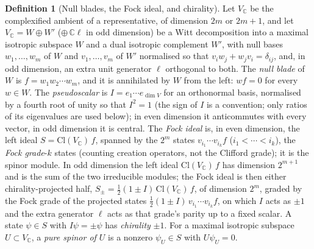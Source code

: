 \documentclass[11pt]{article}
\theoremstyle{definition}
\newtheorem{definition}[theorem]{Definition}
\newcommand{\Cl}{\mathrm{Cl}}
\newcommand{\C}{\mathbb{C}}
\begin{document}
\begin{definition}[Null blades, the Fock ideal, and chirality]\label{def:fock}
Let $V_{\C}$ be the complexified ambient of a representative, of dimension $2m$ or $2m + 1$, and let $V_{\C} = W \oplus W'$ ($\oplus\, \C\ell$ in odd dimension) be a Witt decomposition into a maximal isotropic subspace $W$ and a dual isotropic complement $W'$, with null bases $w_{1}, \ldots, w_{m}$ of $W$ and $v_{1}, \ldots, v_{m}$ of $W'$ normalised so that $v_{i}w_{j} + w_{j}v_{i} = \delta_{ij}$, and, in odd dimension, an extra unit generator $\ell$ orthogonal to both. The \emph{null blade} of $W$ is $f = w_{1}w_{2}\cdots w_{m}$, and it is annihilated by $W$ from the left: $wf = 0$ for every $w \in W$. The \emph{pseudoscalar} is $I = e_{1}\cdots e_{\dim V}$ for an orthonormal basis, normalised by a fourth root of unity so that $I^{2} = 1$ (the sign of $I$ is a convention; only ratios of its eigenvalues are used below); in even dimension it anticommutes with every vector, in odd dimension it is central. The \emph{Fock ideal} is, in even dimension, the left ideal $S = \Cl(V_{\C})\,f$, spanned by the $2^{m}$ states $v_{i_{1}}\cdots v_{i_{k}}f$ ($i_{1} < \cdots < i_{k}$), the \emph{Fock grade}-$k$ states (counting creation operators, not the Clifford grade); it is the spinor module. In odd dimension the left ideal $\Cl(V_{\C})\,f$ has dimension $2^{m+1}$ and is the sum of the two irreducible modules; the Fock ideal is then either chirality-projected half, $S_{\pm} = \tfrac{1}{2}(1 \pm I)\,\Cl(V_{\C})\,f$, of dimension $2^{m}$, graded by the Fock grade of the projected states $\tfrac{1}{2}(1 \pm I)\,v_{i_{1}}\cdots v_{i_{k}}f$, on which $I$ acts as $\pm 1$ and the extra generator $\ell$ acts as that grade's parity up to a fixed scalar. A state $\psi \in S$ with $I\psi = \pm\psi$ has \emph{chirality} $\pm 1$. For a maximal isotropic subspace $U \subset V_{\C}$, a \emph{pure spinor of $U$} is a nonzero $\psi_{U} \in S$ with $U\psi_{U} = 0$.
\end{definition}
\end{document}
